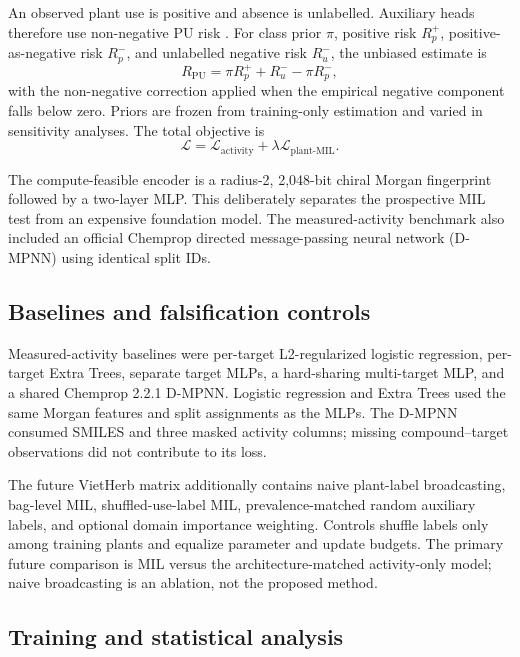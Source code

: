\documentclass[11pt]{article}
\begin{document}
An observed plant use is positive and absence is unlabelled. Auxiliary heads
therefore use non-negative PU risk \citep{kiryo2017nnpu}. For class prior
$\pi$, positive risk $R_p^+$, positive-as-negative risk $R_p^-$, and unlabelled
negative risk $R_u^-$, the unbiased estimate is
\begin{equation}
R_{\mathrm{PU}}=\pi R_p^+ + R_u^- - \pi R_p^- ,
\end{equation}
with the non-negative correction applied when the empirical negative component
falls below zero. Priors are frozen from training-only estimation and varied in
sensitivity analyses. The total objective is
\begin{equation}
\mathcal{L}=\mathcal{L}_{\mathrm{activity}}+
\lambda\mathcal{L}_{\mathrm{plant\text{-}MIL}}.
\end{equation}

The compute-feasible encoder is a radius-2, 2,048-bit chiral Morgan fingerprint
followed by a two-layer MLP. This deliberately separates the prospective MIL
test from an expensive foundation model. The measured-activity benchmark also
included an official Chemprop directed message-passing neural network (D-MPNN)
\citep{yang2019chemprop} using identical split IDs.

\subsection{Baselines and falsification controls}

Measured-activity baselines were per-target L2-regularized logistic regression,
per-target Extra Trees, separate target MLPs, a hard-sharing multi-target MLP,
and a shared Chemprop 2.2.1 D-MPNN. Logistic regression and Extra Trees used the
same Morgan features and split assignments as the MLPs. The D-MPNN consumed
SMILES and three masked activity columns; missing compound--target observations
did not contribute to its loss.

The future VietHerb matrix additionally contains naive plant-label broadcasting,
bag-level MIL, shuffled-use-label MIL, prevalence-matched random auxiliary
labels, and optional domain importance weighting. Controls shuffle labels only
among training plants and equalize parameter and update budgets. The primary
future comparison is MIL versus the architecture-matched activity-only model;
naive broadcasting is an ablation, not the proposed method.

\subsection{Training and statistical analysis}
\end{document}
